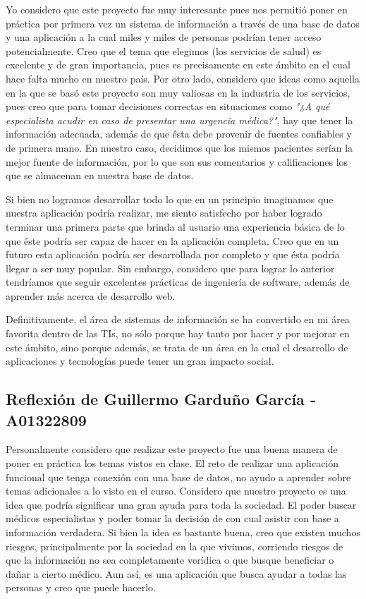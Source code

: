 Yo considero que este proyecto fue muy interesante pues nos permitió poner en práctica por primera vez un sistema de información a través de una base de datos y una aplicación a la cual miles y miles de personas podrían tener acceso potencialmente. Creo que el tema que elegimos (los servicios de salud) es excelente y de gran importancia, pues es precisamente en este ámbito en el cual hace falta mucho en nuestro país. Por otro lado, considero que ideas como aquella en la que se basó este proyecto son muy valiosas en la industria de los servicios, pues creo que para tomar decisiones correctas en situaciones como \textit{"¿A qué especialista acudir en caso de presentar una urgencia médica?"}, hay que tener la información adecuada, además de que ésta debe provenir de fuentes confiables y de primera mano. En nuestro caso, decidimos que los mismos pacientes serían la mejor fuente de información, por lo que son sus comentarios y calificaciones los que se almacenan en nuestra base de datos. 

\vspace{0.3 cm}

Si bien no logramos desarrollar todo lo que en un principio imaginamos que nuestra aplicación podría realizar, me siento satisfecho por haber logrado terminar una primera parte que brinda al usuario una experiencia básica de lo que éste podría ser capaz de hacer en la aplicación completa. Creo que en un futuro esta aplicación podría ser desarrollada por completo y que ésta podría llegar a ser muy popular. Sin embargo, considero que para lograr lo anterior tendríamos que seguir excelentes prácticas de ingeniería de software, además de aprender más acerca de 
desarrollo web. 

\vspace{0.3 cm}

Definitivamente, el área de sistemas de información se ha convertido en mi área favorita dentro de las TIs, no sólo porque hay tanto por hacer y por mejorar en este ámbito, sino porque además, se trata de un área en la cual el desarrollo de aplicaciones y tecnologías puede tener un gran impacto social.

\subsection{Reflexión de Guillermo Garduño García - A01322809}
Personalmente considero que realizar este proyecto fue una buena manera de poner en práctica los temas vistos en clase. El reto de realizar una aplicación funcional que tenga conexión con una base de datos, no ayudo a aprender sobre temas adicionales a lo visto en el curso. Considero que nuestro proyecto es una idea que podría significar una gran ayuda para toda la sociedad. El poder buscar médicos especialistas y poder tomar la decisión de con cual asistir con base a información verdadera. Si bien la idea es bastante buena, creo que existen muchos riesgos, principalmente por la sociedad en la que vivimos, corriendo riesgos de que la información no sea completamente verídica o que busque beneficiar o dañar a cierto médico. Aun así, es una aplicación que busca ayudar a todas las personas y creo que puede hacerlo.

